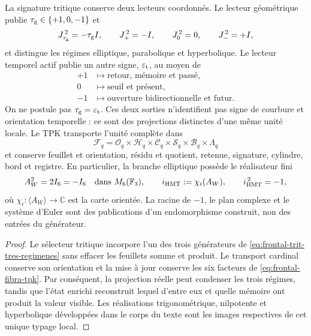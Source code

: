 \begin{proposition}
La signature tritique conserve deux lecteurs coordonnés. Le lecteur géométrique
publie \(\tau_{\rm g}\in\{+1,0,-1\}\) et
\begin{equation}
 J_{\tau_{\rm g}}^{\,2}=-\tau_{\rm g}I,\qquad
 J_+^{\,2}=-I,\qquad J_0^{\,2}=0,\qquad J_-^{\,2}=+I,
 \label{eq:frontal-trit-tres-regimenes}
\end{equation}
et distingue les régimes elliptique, parabolique et hyperbolique. Le lecteur
temporel actif publie un autre signe, \(\varepsilon_{\rm t}\), au moyen de
\begin{equation}
 \begin{aligned}
 +1&\mapsto\text{retour, mémoire et passé},\\
 0&\mapsto\text{seuil et présent},\\
 -1&\mapsto\text{ouverture bidirectionnelle et futur}.
 \end{aligned}
 \label{eq:frontal-trit-tiempo}
\end{equation}
On ne postule pas \(\tau_{\rm g}=\varepsilon_{\rm t}\). Ces deux sorties
n'identifient pas signe de courbure et orientation temporelle : ce sont des projections
distinctes d'une même unité locale. Le TPK transporte
l'unité complète dans
\begin{equation}
 \mathcal F_q=
 \mathcal O_q\times\mathcal H_q\times\mathcal C_q\times
 \mathcal S_q\times\mathcal B_q\times\Lambda_q
 \label{eq:frontal-fibra-tpk}
\end{equation}
et conserve feuillet et orientation, résidu et quotient, retenue, signature, cylindre,
bord et registre. En particulier, la branche elliptique possède le réalisateur
fini
\begin{equation}
 A_W^2=2I_6=-I_6\quad\text{dans }M_6(\mathbb F_3),\qquad
 i_{\rm HMT}:=\chi_i(A_W),\qquad i_{\rm HMT}^{\,2}=-1,
 \label{eq:frontal-raiz-interna-menos-uno}
\end{equation}
où \(\chi_i:\langle A_W\rangle\to\mathbb C\) est la carte orientée.
La racine de \(-1\), le plan complexe et le système d'Euler sont des publications
d'un endomorphisme construit, non des entrées du générateur.
\end{proposition}

\begin{proof}
Le sélecteur tritique incorpore l'un des trois générateurs de
\eqref{eq:frontal-trit-tres-regimenes} sans effacer les feuillets somme et produit.
Le transport cardinal conserve son orientation et la mise à jour conserve
les six facteurs de \eqref{eq:frontal-fibra-tpk}. Par conséquent, la projection
réelle peut condenser les trois régimes, tandis que l'état enrichi
reconstruit lequel d'entre eux et quelle mémoire ont produit la valeur visible. Les
réalisations trigonométrique, nilpotente et hyperbolique développées dans le
corps du texte sont les images respectives de cet unique typage local.
\end{proof}

